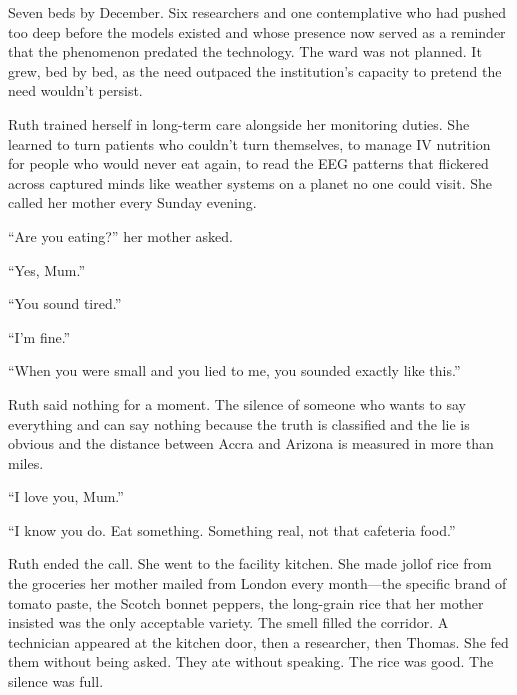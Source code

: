 Seven beds by December. Six researchers and one contemplative who had pushed too deep before the models existed and whose presence now served as a reminder that the phenomenon predated the technology. The ward was not planned. It grew, bed by bed, as the need outpaced the institution's capacity to pretend the need wouldn't persist.

Ruth trained herself in long-term care alongside her monitoring duties. She learned to turn patients who couldn't turn themselves, to manage IV nutrition for people who would never eat again, to read the EEG patterns that flickered across captured minds like weather systems on a planet no one could visit. She called her mother every Sunday evening.

``Are you eating?'' her mother asked.

``Yes, Mum.''

``You sound tired.''

``I'm fine.''

``When you were small and you lied to me, you sounded exactly like this.''

Ruth said nothing for a moment. The silence of someone who wants to say everything and can say nothing because the truth is classified and the lie is obvious and the distance between Accra and Arizona is measured in more than miles.

``I love you, Mum.''

``I know you do. Eat something. Something real, not that cafeteria food.''

Ruth ended the call. She went to the facility kitchen. She made jollof rice from the groceries her mother mailed from London every month---the specific brand of tomato paste, the Scotch bonnet peppers, the long-grain rice that her mother insisted was the only acceptable variety. The smell filled the corridor. A technician appeared at the kitchen door, then a researcher, then Thomas. She fed them without being asked. They ate without speaking. The rice was good. The silence was full.
